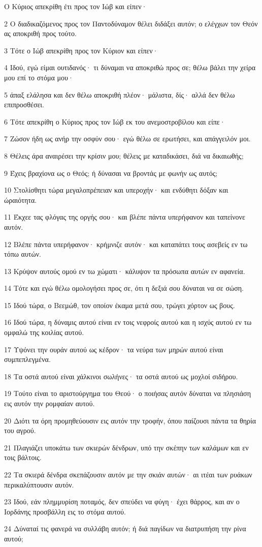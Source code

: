\par Ο Κύριος απεκρίθη έτι προς τον Ιώβ και είπεν·
\par 2 Ο διαδικαζόμενος προς τον Παντοδύναμον θέλει διδάξει αυτόν; ο ελέγχων τον Θεόν ας αποκριθή προς τούτο.
\par 3 Τότε ο Ιώβ απεκρίθη προς τον Κύριον και είπεν·
\par 4 Ιδού, εγώ είμαι ουτιδανός· τι δύναμαι να αποκριθώ προς σε; θέλω βάλει την χείρα μου επί το στόμα μου·
\par 5 άπαξ ελάλησα και δεν θέλω αποκριθή πλέον· μάλιστα, δίς· αλλά δεν θέλω επιπροσθέσει.
\par 6 Τότε απεκρίθη ο Κύριος προς τον Ιώβ εκ του ανεμοστροβίλου και είπε·
\par 7 Ζώσον ήδη ως ανήρ την οσφύν σου· εγώ θέλω σε ερωτήσει, και απάγγειλόν μοι.
\par 8 Θέλεις άρα αναιρέσει την κρίσιν μου; θέλεις με καταδικάσει, διά να δικαιωθής;
\par 9 Έχεις βραχίονα ως ο Θεός; ή δύνασαι να βροντάς με φωνήν ως αυτός;
\par 10 Στολίσθητι τώρα μεγαλοπρέπειαν και υπεροχήν· και ενδύθητι δόξαν και ώραιότητα.
\par 11 Έκχεε τας φλόγας της οργής σου· και βλέπε πάντα υπερήφανον και ταπείνονε αυτόν.
\par 12 Βλέπε πάντα υπερήφανον· κρήμνιζε αυτόν· και καταπάτει τους ασεβείς εν τω τόπω αυτών.
\par 13 Κρύψον αυτούς ομού εν τω χώματι· κάλυψον τα πρόσωπα αυτών εν αφανεία.
\par 14 Τότε και εγώ θέλω ομολογήσει προς σε, ότι η δεξιά σου δύναται να σε σώση.
\par 15 Ιδού τώρα, ο Βεεμώθ, τον οποίον έκαμα μετά σου, τρώγει χόρτον ως βους.
\par 16 Ιδού τώρα, η δύναμις αυτού είναι εν τοις νεφροίς αυτού και η ισχύς αυτού εν τω ομφαλώ της κοιλίας αυτού.
\par 17 Υψόνει την ουράν αυτού ως κέδρον· τα νεύρα των μηρών αυτού είναι συμπεπλεγμένα.
\par 18 Τα οστά αυτού είναι χάλκινοι σωλήνες· τα οστά αυτού ως μοχλοί σιδήρου.
\par 19 Τούτο είναι το αριστούργημα του Θεού· ο ποιήσας αυτόν δύναται να πλησιάση εις αυτόν την ρομφαίαν αυτού.
\par 20 Διότι τα όρη προμηθεύουσιν εις αυτόν την τροφήν, όπου παίζουσι πάντα τα θηρία του αγρού.
\par 21 Πλαγιάζει υποκάτω των σκιερών δένδρων, υπό την σκέπην των καλάμων και εν τοις βάλτοις.
\par 22 Τα σκιερά δένδρα σκεπάζουσιν αυτόν με την σκιάν αυτών· αι ιτέαι των ρυάκων περικαλύπτουσιν αυτόν.
\par 23 Ιδού, εάν πλημμυρίση ποταμός, δεν σπεύδει να φύγη· έχει θάρρος, και αν ο Ιορδάνης προσβάλλη εις το στόμα αυτού.
\par 24 Δύναταί τις φανερά να συλλάβη αυτόν; ή διά παγίδων να διατρυπήση την ρίνα αυτού;

